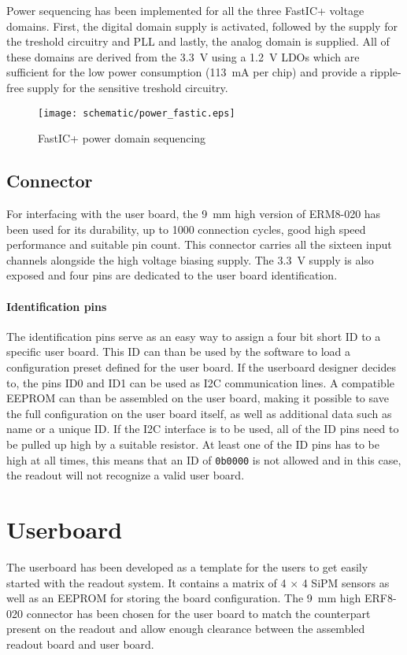 Power sequencing has been implemented for all the three FastIC+ voltage domains. First, the digital domain supply is activated, followed by the supply for the treshold circuitry and PLL and lastly, the analog domain is supplied. All of these domains are derived from the \SI{3.3}{\volt} using a \SI{1.2}{\volt} LDOs which are sufficient for the low power consumption (\SI{113}{\milli\ampere} per chip) and provide a ripple-free supply for the sensitive treshold circuitry.

\FloatBarrier
\begin{figure}[htp!]
    \centering
    \texttt{[image: schematic/power\_fastic.eps]}
    \caption{FastIC+ power domain sequencing}
    \label{fig:schem_fastic_power}
\end{figure}
\FloatBarrier

\section{Connector}
For interfacing with the user board, the \SI{9}{\milli\meter} high version of ERM8-020 has been used for its durability, up to 1000 connection cycles, good high speed performance and suitable pin count. This connector carries all the sixteen input channels alongside the high voltage biasing supply. The \SI{3.3}{\volt} supply is also exposed and four pins are dedicated to the user board identification.
%
\subsubsection{Identification pins}
The identification pins serve as an easy way to assign a four bit short ID to a specific user board. This ID can than be used by the software to load a configuration preset defined for the user board. If the userboard designer decides to, the pins ID0 and ID1 can be used as I2C communication lines. A compatible EEPROM can than be assembled on the user board, making it possible to save the full configuration on the user board itself, as well as additional data such as name or a unique ID. If the I2C interface is to be used, all of the ID pins need to be pulled up high by a suitable resistor. At least one of the ID pins has to be high at all times, this means that an ID of \verb|0b0000| is not allowed and in this case, the readout will not recognize a valid user board. 
%
\chapter{Userboard}
The userboard has been developed as a template for the users to get easily started with the readout system. It contains a matrix of 4 $\times$ 4 SiPM sensors as well as an EEPROM for storing the board configuration. The \SI{9}{\milli\meter} high ERF8-020 connector has been chosen for the user board to match the counterpart present on the readout and allow enough clearance between the assembled readout board and user board.

